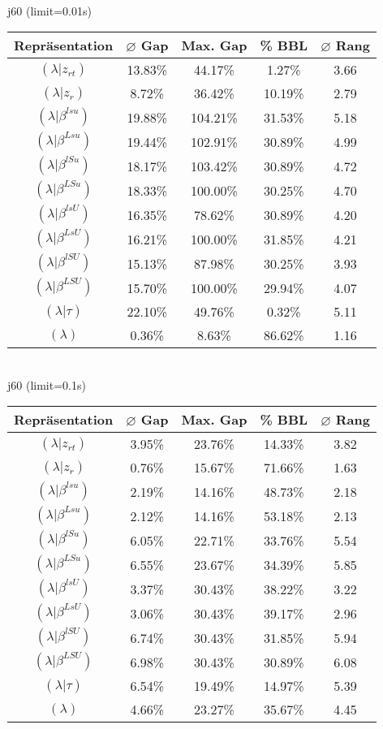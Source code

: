 \documentclass{scrartcl}
\begin{document}
\\[8pt]j60 (limit=0.01s)\\\begin{tabular}{ccccc}
\hline
Repräsentation & $\varnothing$ Gap & Max. Gap & \% BBL & $\varnothing$ Rang\\[3pt]
\hline
$(\lambda|z_{rt})$&13.83\%&44.17\%&1.27\%&3.66\\
\hline
$(\lambda|z_r)$&8.72\%&36.42\%&10.19\%&2.79\\
\hline
$(\lambda|\beta^{lsu})$&19.88\%&104.21\%&31.53\%&5.18\\
\hline
$(\lambda|\beta^{Lsu})$&19.44\%&102.91\%&30.89\%&4.99\\
\hline
$(\lambda|\beta^{lSu})$&18.17\%&103.42\%&30.89\%&4.72\\
\hline
$(\lambda|\beta^{LSu})$&18.33\%&100.00\%&30.25\%&4.70\\
\hline
$(\lambda|\beta^{lsU})$&16.35\%&78.62\%&30.89\%&4.20\\
\hline
$(\lambda|\beta^{LsU})$&16.21\%&100.00\%&31.85\%&4.21\\
\hline
$(\lambda|\beta^{lSU})$&15.13\%&87.98\%&30.25\%&3.93\\
\hline
$(\lambda|\beta^{LSU})$&15.70\%&100.00\%&29.94\%&4.07\\
\hline
$(\lambda|\tau)$&22.10\%&49.76\%&0.32\%&5.11\\
\hline
$(\lambda)$&0.36\%&8.63\%&86.62\%&1.16\\\hline
\end{tabular}
\\[8pt]j60 (limit=0.1s)\\\begin{tabular}{ccccc}
\hline
Repräsentation & $\varnothing$ Gap & Max. Gap & \% BBL & $\varnothing$ Rang\\[3pt]
\hline
$(\lambda|z_{rt})$&3.95\%&23.76\%&14.33\%&3.82\\
\hline
$(\lambda|z_r)$&0.76\%&15.67\%&71.66\%&1.63\\
\hline
$(\lambda|\beta^{lsu})$&2.19\%&14.16\%&48.73\%&2.18\\
\hline
$(\lambda|\beta^{Lsu})$&2.12\%&14.16\%&53.18\%&2.13\\
\hline
$(\lambda|\beta^{lSu})$&6.05\%&22.71\%&33.76\%&5.54\\
\hline
$(\lambda|\beta^{LSu})$&6.55\%&23.67\%&34.39\%&5.85\\
\hline
$(\lambda|\beta^{lsU})$&3.37\%&30.43\%&38.22\%&3.22\\
\hline
$(\lambda|\beta^{LsU})$&3.06\%&30.43\%&39.17\%&2.96\\
\hline
$(\lambda|\beta^{lSU})$&6.74\%&30.43\%&31.85\%&5.94\\
\hline
$(\lambda|\beta^{LSU})$&6.98\%&30.43\%&30.89\%&6.08\\
\hline
$(\lambda|\tau)$&6.54\%&19.49\%&14.97\%&5.39\\
\hline
$(\lambda)$&4.66\%&23.27\%&35.67\%&4.45\\\hline
\end{tabular}
\end{document}
